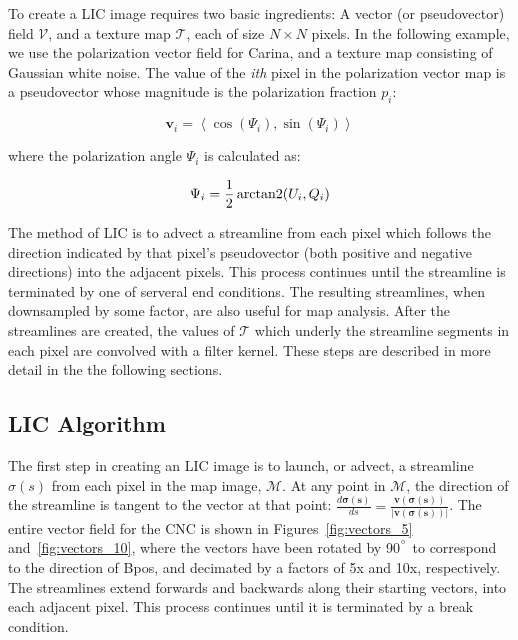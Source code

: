 To create a LIC image requires two basic ingredients: A vector (or pseudovector) field $\boldsymbol{\mathcal{V}}$, and a texture map $\mathcal{T}$, each of size $N \times N$ pixels. In the following example, we use the polarization vector field for Carina, and a texture map consisting of Gaussian white noise. The value of the \textit{ith} pixel in the polarization vector map is a pseudovector whose magnitude is the polarization fraction $p_{i}$:

\begin{equation}\label{eq:pol vector}
  \boldsymbol{v}_{i} = \left< \mathrm{\cos}(\Psi_{i}), \mathrm{\sin}(
  \Psi_{i}) \right>
\end{equation}

where the polarization angle $\Psi_{i}$ is calculated as:

\begin{equation}\label{eq:pol angle 2}
  \Psi_{i} = \frac{1}{2}\operatorname{arctan2}(U_{i}, Q_{i})
\end{equation}

The method of LIC is to advect a streamline from each pixel which follows the direction indicated by that pixel's pseudovector (both positive and negative directions) into the adjacent pixels. This process continues until the streamline is terminated by one of serveral end conditions. The resulting streamlines, when downsampled by some factor, are also useful for map analysis. After the streamlines are created, the values of $\mathcal{T}$ which underly the streamline segments in each pixel are convolved with a filter kernel. These steps are described in more detail in the the following sections.

\subsection{LIC Algorithm}

The first step in creating an LIC image is to launch, or advect, a streamline $\sigma(s)$ from each pixel in the map image, $\mathcal{M}$. At any point in $\mathcal{M}$, the direction of the streamline is tangent to the vector at that point: $\frac{ d\boldsymbol{\sigma(s)}}{ds} = \boldsymbol{ \frac{ v(\sigma(s)) }{\lvert v(\sigma(s)) \rvert} }$. The entire vector field for the CNC is shown in Figures~\ref{fig:vectors_5} and~\ref{fig:vectors_10}, where the vectors have been rotated by 90$^{\degree}$ to correspond to the direction of \gls{Bpos}, and decimated by a factors of 5x and 10x, respectively. The streamlines extend forwards and backwards along their starting vectors, into each adjacent pixel. This process continues until it is terminated by a break condition.

